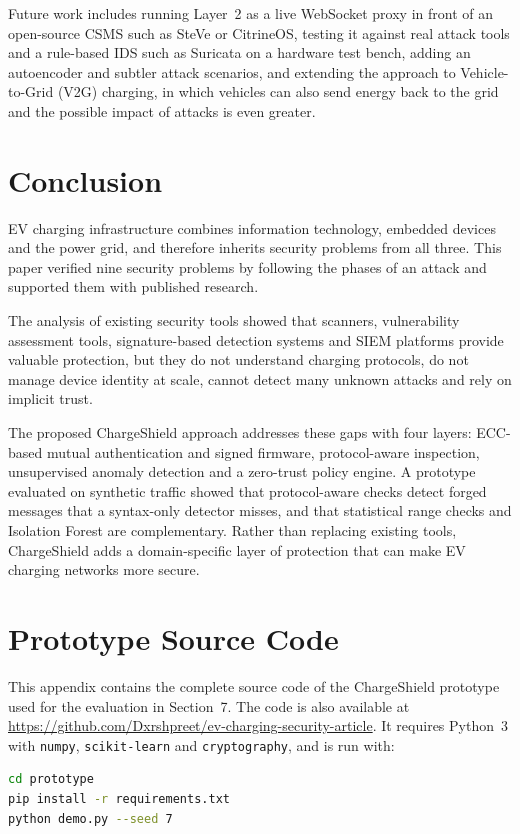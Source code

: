 \documentclass[runningheads]{llncs}
\begin{document}
Future work includes running Layer~2 as a live WebSocket proxy in front of an open-source CSMS such as SteVe or CitrineOS, testing it against real attack tools and a rule-based IDS such as Suricata on a hardware test bench, adding an autoencoder and subtler attack scenarios, and extending the approach to Vehicle-to-Grid (V2G) charging, in which vehicles can also send energy back to the grid and the possible impact of attacks is even greater.

\section{Conclusion}
EV charging infrastructure combines information technology, embedded devices and the power grid, and therefore inherits security problems from all three. This paper verified nine security problems by following the phases of an attack and supported them with published research.

The analysis of existing security tools showed that scanners, vulnerability assessment tools, signature-based detection systems and SIEM platforms provide valuable protection, but they do not understand charging protocols, do not manage device identity at scale, cannot detect many unknown attacks and rely on implicit trust.

The proposed ChargeShield approach addresses these gaps with four layers: ECC-based mutual authentication and signed firmware, protocol-aware inspection, unsupervised anomaly detection and a zero-trust policy engine. A prototype evaluated on synthetic traffic showed that protocol-aware checks detect forged messages that a syntax-only detector misses, and that statistical range checks and Isolation Forest are complementary. Rather than replacing existing tools, ChargeShield adds a domain-specific layer of protection that can make EV charging networks more secure.




\appendix
\section{Prototype Source Code}\label{app:code}
This appendix contains the complete source code of the ChargeShield prototype used for the evaluation in Section~7. The code is also available at \url{https://github.com/Dxrshpreet/ev-charging-security-article}. It requires Python~3 with \texttt{numpy}, \texttt{scikit-learn} and \texttt{cryptography}, and is run with:
\begin{lstlisting}[language=bash,numbers=none]
cd prototype
pip install -r requirements.txt
python demo.py --seed 7
\end{lstlisting}
\end{document}

